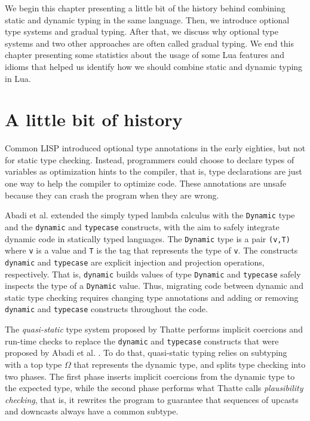 We begin this chapter presenting a little bit of the history behind
combining static and dynamic typing in the same language.
Then, we introduce optional type systems and gradual typing.
After that, we discuss why optional type systems and two
other approaches are often called gradual typing.
We end this chapter presenting some statistics about the usage of
some Lua features and idioms that helped us identify how we should
combine static and dynamic typing in Lua.

\section{A little bit of history}
\label{sec:history}

Common LISP \cite{steele1982ocl} introduced optional type annotations
in the early eighties, but not for static type checking.
Instead, programmers could choose to declare types of variables as
optimization hints to the compiler, that is, type declarations are
just one way to help the compiler to optimize code.
These annotations are unsafe because they can crash the program
when they are wrong.

Abadi et al. \cite{abadi1989dts} extended the simply typed
lambda calculus with the \texttt{Dynamic} type and the \texttt{dynamic}
and \texttt{typecase} constructs, with the aim to safely integrate dynamic
code in statically typed languages.
The \texttt{Dynamic} type is a pair \texttt{(v,T)} where \texttt{v} is a
value and \texttt{T} is the tag that represents the type of \texttt{v}.
The constructs \texttt{dynamic} and \texttt{typecase} are explicit
injection and projection operations, respectively.
That is, \texttt{dynamic} builds values of type \texttt{Dynamic} and
\texttt{typecase} safely inspects the type of a \texttt{Dynamic} value.
Thus, migrating code between dynamic and static type checking requires
changing type annotations and adding or removing \texttt{dynamic} and
\texttt{typecase} constructs throughout the code.

The \emph{quasi-static} type system proposed by Thatte \cite{thatte1990qst}
performs implicit coercions and run-time checks to replace the
\texttt{dynamic} and \texttt{typecase} constructs that were proposed by
Abadi et al. \cite{abadi1989dts}.
To do that, quasi-static typing relies on subtyping with a top type
$\Omega$ that represents the dynamic type, and splits type checking
into two phases.
The first phase inserts implicit coercions from the dynamic type to
the expected type, while the second phase performs what Thatte calls
\emph{plausibility checking}, that is, it rewrites the program to
guarantee that sequences of upcasts and downcasts always have a
common subtype.

